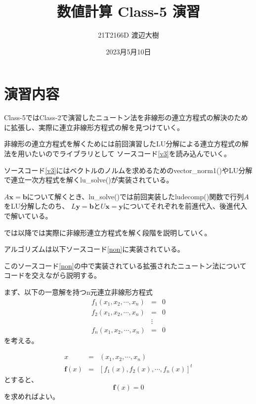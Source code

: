 \documentclass[a4paper,11pt]{jsarticle}
\begin{document}
\title{数値計算 Class-5 演習}
\author{21T2166D 渡辺大樹}
\date{2023月5月10日}
\maketitle

\section{演習内容}
Class-5ではClass-2で演習したニュートン法を非線形の連立方程式の解決のために拡張し、実際に連立非線形方程式の解を見つけていく。

非線形の連立方程式を解くためには前回演習したLU分解による連立方程式の解法を用いたいのでライブラリとして
ソースコード\ref{v3}を読み込んでいく。


ソースコード\ref{v3}にはベクトルのノルムを求めるためのvector\_norm1()やLU分解で連立一次方程式を解くlu\_solve()が実装されている。

$A\textbf{x}=\textbf{b}$について解くとき、lu\_solve()では前回実装したludecomp()関数で行列$A$をLU分解したのち、
$L\textbf{y}=\textbf{b}$と$U\textbf{x}=\textbf{y}$についてそれぞれを前進代入、後進代入で解いている。

では以降では実際に非線形連立方程式を解く段階を説明していく。

アルゴリズムは以下ソースコード\ref{non}に実装されている。


\newpage
このソースコード\ref{non}の中で実装されている拡張されたニュートン法についてコードを交えながら説明する。

まず、以下の一意解を持つn元連立非線形方程式
\begin{displaymath}
    \begin{array}{lll}
        f_1(x_1,x_2,\cdots,x_n) &=& 0 \\
        f_2(x_1,x_2,\cdots,x_n) &=& 0 \\
        & \vdots & \\
        f_n(x_1,x_2,\cdots,x_n) &=& 0 
    \end{array}
\end{displaymath}
を考える。

\begin{displaymath}
    \begin{array}{lll}
        x &=& (x_1,x_2,\cdots,x_n) \\
        \textbf{f}(x) &=& [f_1(x), f_2(x), \cdots, f_n(x)]^t
    \end{array}
\end{displaymath}
とすると、
\begin{displaymath}
    \textbf{f}(x) = 0
\end{displaymath}
を求めればよい。
\end{document}
